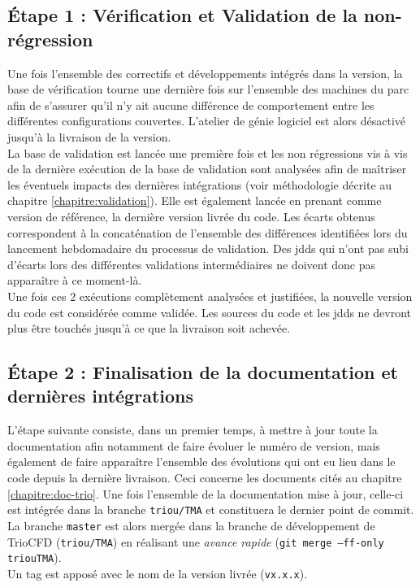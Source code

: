\subsection{Étape 1 : Vérification et Validation de la non-r\'egression}
Une fois l'ensemble des correctifs et développements intégrés dans la version,
la base de vérification tourne une dernière fois sur l'ensemble des machines
du parc afin de s'assurer qu'il n'y ait aucune différence de comportement
entre les différentes configurations couvertes.
L'atelier de génie logiciel est alors désactivé jusqu'à la livraison de la version.\\
La base de validation est lancée une première fois et les non régressions
vis à vis de la dernière exécution de la base de validation sont analysées
afin de maîtriser les éventuels impacts des dernières intégrations
(voir méthodologie décrite au chapitre \ref{chapitre:validation}).
Elle est également lancée en prenant comme version de référence, la dernière version livrée du code.
Les écarts obtenus correspondent à la concaténation de l'ensemble des différences
identifiées lors du lancement hebdomadaire du processus de validation.
Des jdds qui n'ont pas subi d'écarts lors des différentes validations
intermédiaires ne doivent donc pas apparaître à ce moment-là.\\
Une fois ces 2 exécutions complètement analysées et justifiées,
la nouvelle version du code est considérée comme validée.
Les sources du code et les jdds ne devront plus être touchés jusqu'à ce que la livraison soit achevée.

\subsection{Étape 2 : Finalisation de la documentation et dernières intégrations}
L'étape suivante consiste, dans un premier temps, à mettre à jour toute
la documentation afin notamment de faire évoluer le numéro de version,
mais également de faire apparaître l'ensemble des évolutions qui ont eu lieu
dans le code depuis la dernière livraison.
Ceci concerne les documents cités au chapitre \ref{chapitre:doc-trio}.
Une fois l'ensemble de la documentation mise à jour, celle-ci est intégrée dans la branche \texttt{triou/TMA}
et constituera le dernier point de commit.\\

La branche \texttt{master} est alors merg\'ee dans la branche de développement de TrioCFD (\texttt{triou/TMA})
en r\'ealisant une \emph{avance rapide} (\texttt{git merge --ff-only triou\/TMA}).\\
Un tag est apposé avec le nom de la version livrée (\texttt{vx.x.x}).


